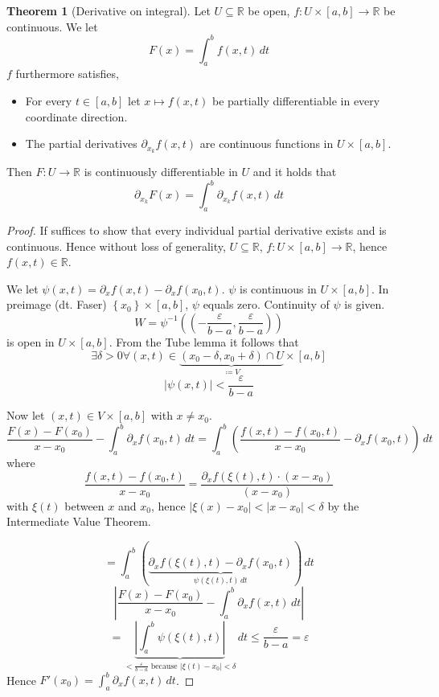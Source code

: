 \documentclass[a4paper,landscape,twocolumn]{article}
\theoremstyle{definition}
\newtheorem{theorem}{Theorem}
\newcommand\set[1]{\left\{#1\right\}}
\newcommand\abs[1]{\left|#1\right|}
\begin{document}
\begin{theorem}[Derivative on integral]
  Let $U \subseteq \mathbb R$ be open, $f: U \times [a,b] \to \mathbb R$ be continuous. We let
  \[ F(x) = \int_a^b f(x,t) \, dt \]
  $f$ furthermore satisfies,
  \begin{itemize}
    \item For every $t \in [a,b]$ let $x \mapsto f(x,t)$ be partially differentiable
      in every coordinate direction.
    \item The partial derivatives $\partial_{x_k} f(x,t)$ are continuous functions
      in $U \times [a,b]$.
  \end{itemize}
  Then $F: U \to \mathbb R$ is continuously differentiable in $U$ and it holds that
  \[ \partial_{x_k} F(x) = \int_a^b \partial_{x_k} f(x,t) \, dt \]
\end{theorem}
\begin{proof}
  If suffices to show that every individual partial derivative
  exists and is continuous. Hence without loss of generality,
  $U \subseteq \mathbb R$, $f: U \times [a,b] \to \mathbb R$,
  hence $f(x,t) \in \mathbb R$.

  We let $\psi(x,t) = \partial_x f(x,t) - \partial_x f(x_0,t)$.
  $\psi$ is continuous in $U \times [a,b]$.
  In preimage (dt. Faser) $\set{x_0} \times [a,b]$, $\psi$ equals zero.
  Continuity of $\psi$ is given.
  \[ W = \psi^{-1}\left(\left(-\frac{\varepsilon}{b-a}, \frac{\varepsilon}{b-a}\right)\right) \]
  is open in $U \times [a,b]$. From the Tube lemma it follows that
  \[ \exists \delta > 0 \forall (x,t) \in \underbrace{(x_0 - \delta, x_0 + \delta) \cap U}_{\coloneqq V} \times [a,b] \]
  \[ \abs{\psi(x,t)} < \frac{\varepsilon}{b - a} \]

  Now let $(x,t) \in V \times [a,b]$ with $x \neq x_0$.
  \[ \frac{F(x) - F(x_0)}{x - x_0} - \int_a^b \partial_x f(x_0,t) \, dt = \int_a^b \left(\frac{f(x,t) - f(x_0,t)}{x - x_0} - \partial_x f(x_0,t)\right) \, dt \]
  where
  \[ \frac{f(x,t) - f(x_0,t)}{x - x_0} = \frac{\partial_x f(\xi(t),t) \cdot (x - x_0)}{(x - x_0)} \]
  with $\xi(t)$ between $x$ and $x_0$, hence $\abs{\xi(x) - x_0} < \abs{x - x_0} < \delta$ by the Intermediate Value Theorem.

  \[ = \int_a^b \left(\underbrace{\partial_x f(\xi(t), t) - \partial_x f(x_0,t)}_{\psi(\xi(t),t) \, dt}\right) \, dt \]
  \[ \abs{\frac{F(x) - F(x_0)}{x - x_0} - \int_a^b \partial_x f(x,t) \, dt} \]
  \[ = \underbrace{\abs{\int_a^b \psi(\xi(t),t)}}_{< \frac{\varepsilon}{b-a} \text{ because } \abs{\xi(t)-x_0} < \delta} \, dt \leq \frac{\varepsilon}{b - a} = \varepsilon \]
  Hence $F'(x_0) = \int_a^b \partial_x f(x,t) \, dt$.
\end{proof}
\end{document}
